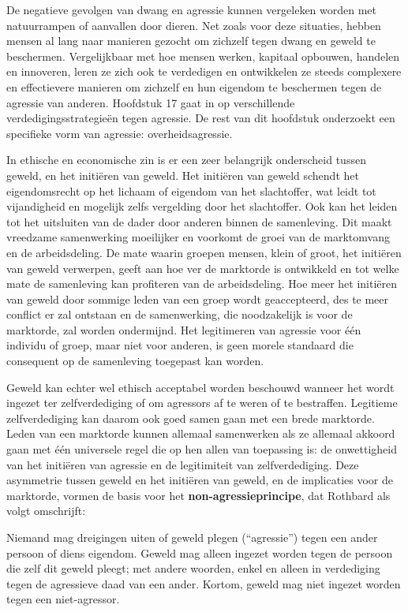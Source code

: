 De negatieve gevolgen van dwang en agressie kunnen vergeleken worden met natuurrampen of aanvallen door dieren. Net zoals voor deze situaties, hebben mensen al lang naar manieren gezocht om zichzelf tegen dwang en geweld te beschermen. Vergelijkbaar met hoe mensen werken, kapitaal opbouwen, handelen en innoveren, leren ze zich ook te verdedigen en ontwikkelen ze steeds complexere en effectievere manieren om zichzelf en hun eigendom te beschermen tegen de agressie van anderen. Hoofdstuk 17 gaat in op verschillende verdedigingsstrategieën tegen agressie. De rest van dit hoofdstuk onderzoekt een specifieke vorm van agressie: overheidsagressie.

In ethische en economische zin is er een zeer belangrijk onderscheid tussen geweld, en het initiëren van geweld. Het initiëren van geweld schendt het eigendomsrecht op het lichaam of eigendom van het slachtoffer, wat leidt tot vijandigheid en mogelijk zelfs vergelding door het slachtoffer. Ook kan het leiden tot het uitsluiten van de dader door anderen binnen de samenleving. Dit maakt vreedzame samenwerking moeilijker en voorkomt de groei van de marktomvang en de arbeidsdeling. De mate waarin groepen mensen, klein of groot, het initiëren van geweld verwerpen, geeft aan hoe ver de marktorde is ontwikkeld en tot welke mate de samenleving kan profiteren van de arbeidsdeling. Hoe meer het initiëren van geweld door sommige leden van een groep wordt geaccepteerd, des te meer conflict er zal ontstaan en de samenwerking, die noodzakelijk is voor de marktorde, zal worden ondermijnd. Het legitimeren van agressie voor één individu of groep, maar niet voor anderen, is geen morele standaard die consequent op de samenleving toegepast kan worden.

Geweld kan echter wel ethisch acceptabel worden beschouwd wanneer het wordt ingezet ter zelfverdediging of om agressors af te weren of te bestraffen. Legitieme zelfverdediging kan daarom ook goed samen gaan met een brede marktorde. Leden van een marktorde kunnen allemaal samenwerken als ze allemaal akkoord gaan met één universele regel die op hen allen van toepassing is: de onwettigheid van het initiëren van agressie en de legitimiteit van zelfverdediging. Deze asymmetrie tussen geweld en het initiëren van geweld, en de implicaties voor de marktorde, vormen de basis voor het \textbf{non-agressieprincipe}, dat Rothbard als volgt omschrijft:

\begin{blockquotebox}
Niemand mag dreigingen uiten of geweld plegen (``agressie'') tegen een ander persoon of diens eigendom. Geweld mag alleen ingezet worden tegen de persoon die zelf dit geweld pleegt; met andere woorden, enkel en alleen in verdediging tegen de agressieve daad van een ander. Kortom, geweld mag niet ingezet worden tegen een niet-agressor.\footnotemark
\end{blockquotebox}

